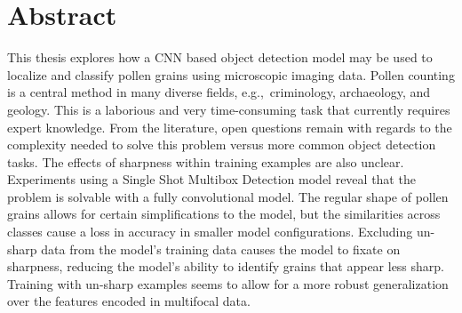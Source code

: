 \chapter*{Abstract}
This thesis explores how a CNN based object detection model may be used to localize and classify pollen grains using microscopic imaging data.
Pollen counting is a central method in many diverse fields, e.g.,\ criminology, archaeology, and geology.
This is a laborious and very time-consuming task that currently requires expert knowledge.
From the literature, open questions remain with regards to the complexity needed to solve this problem versus more common object detection tasks.
The effects of sharpness within training examples are also unclear.
Experiments using a Single Shot Multibox Detection model reveal that the problem is solvable with a fully convolutional model.
The regular shape of pollen grains allows for certain simplifications to the model, but the similarities across classes cause a loss in accuracy in smaller model configurations.
Excluding un-sharp data from the model's training data causes the model to fixate on sharpness, reducing the model's ability to identify grains that appear less sharp.
Training with un-sharp examples seems to allow for a more robust generalization over the features encoded in multifocal data.



